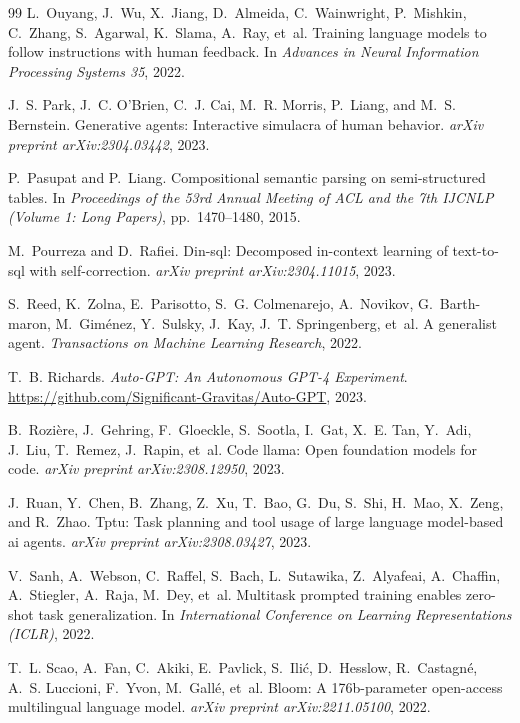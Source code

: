 \begin{thebibliography}{99}
L.~Ouyang, J.~Wu, X.~Jiang, D.~Almeida, C.~Wainwright, P.~Mishkin,
C.~Zhang, S.~Agarwal, K.~Slama, A.~Ray, et~al.
\newblock Training language models to follow instructions with human
feedback.
\newblock In \emph{Advances in Neural Information Processing Systems 35},
2022.

J.~S. Park, J.~C. O'Brien, C.~J. Cai, M.~R. Morris, P.~Liang, and
M.~S. Bernstein.
\newblock Generative agents: Interactive simulacra of human behavior.
\newblock \emph{arXiv preprint arXiv:2304.03442}, 2023.

P.~Pasupat and P.~Liang.
\newblock Compositional semantic parsing on semi-structured tables.
\newblock In \emph{Proceedings of the 53rd Annual Meeting of ACL and the 7th
IJCNLP (Volume 1: Long Papers)}, pp.\ 1470--1480, 2015.

M.~Pourreza and D.~Rafiei.
\newblock Din-sql: Decomposed in-context learning of text-to-sql with
self-correction.
\newblock \emph{arXiv preprint arXiv:2304.11015}, 2023.

S.~Reed, K.~Zolna, E.~Parisotto, S.~G. Colmenarejo, A.~Novikov,
G.~Barth-maron, M.~Gim\'enez, Y.~Sulsky, J.~Kay, J.~T. Springenberg,
et~al.
\newblock A generalist agent.
\newblock \emph{Transactions on Machine Learning Research}, 2022.

T.~B. Richards.
\newblock \emph{Auto-GPT: An Autonomous GPT-4 Experiment}.
\newblock \url{https://github.com/Significant-Gravitas/Auto-GPT}, 2023.

B.~Rozi\`ere, J.~Gehring, F.~Gloeckle, S.~Sootla, I.~Gat, X.~E. Tan,
Y.~Adi, J.~Liu, T.~Remez, J.~Rapin, et~al.
\newblock Code llama: Open foundation models for code.
\newblock \emph{arXiv preprint arXiv:2308.12950}, 2023.

J.~Ruan, Y.~Chen, B.~Zhang, Z.~Xu, T.~Bao, G.~Du, S.~Shi, H.~Mao,
X.~Zeng, and R.~Zhao.
\newblock Tptu: Task planning and tool usage of large language model-based
ai agents.
\newblock \emph{arXiv preprint arXiv:2308.03427}, 2023.

V.~Sanh, A.~Webson, C.~Raffel, S.~Bach, L.~Sutawika, Z.~Alyafeai,
A.~Chaffin, A.~Stiegler, A.~Raja, M.~Dey, et~al.
\newblock Multitask prompted training enables zero-shot task
generalization.
\newblock In \emph{International Conference on Learning Representations
(ICLR)}, 2022.

T.~L. Scao, A.~Fan, C.~Akiki, E.~Pavlick, S.~Ili\'c, D.~Hesslow,
R.~Castagn\'e, A.~S. Luccioni, F.~Yvon, M.~Gall\'e, et~al.
\newblock Bloom: A 176b-parameter open-access multilingual language
model.
\newblock \emph{arXiv preprint arXiv:2211.05100}, 2022.


\end{thebibliography}
